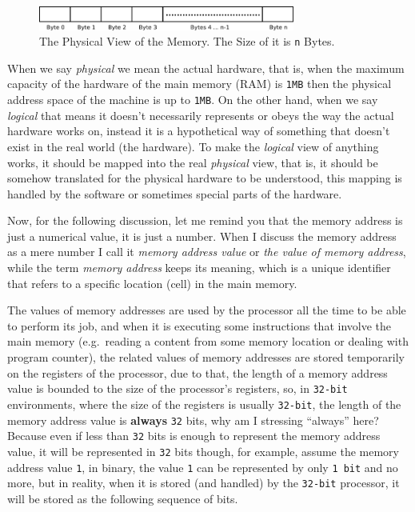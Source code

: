 \begin{figure}
\centering
\includegraphics[width=0.75000\textwidth]{Figures/x86-ch/memory-physical-view.png}
\caption{The Physical View of the Memory. The Size of it is
\lstinline!n! Bytes.}\label{fig:memory_physical_view}
\end{figure}

When we say \emph{physical} we mean the actual hardware, that is, when
the maximum capacity of the hardware of the main memory (RAM) is
\lstinline!1MB! then the physical address space of the machine is up to
\lstinline!1MB!. On the other hand, when we say \emph{logical} that
means it doesn't necessarily represents or obeys the way the actual
hardware works on, instead it is a hypothetical way of something that
doesn't exist in the real world (the hardware). To make the
\emph{logical} view of anything works, it should be mapped into the real
\emph{physical} view, that is, it should be somehow translated for the
physical hardware to be understood, this mapping is handled by the
software or sometimes special parts of the hardware.

Now, for the following discussion, let me remind you that the memory
address is just a numerical value, it is just a number. When I discuss
the memory address as a mere number I call it \emph{memory address
value} or \emph{the value of memory address}, while the term
\emph{memory address} keeps its meaning, which is a unique identifier
that refers to a specific location (cell) in the main memory.

The values of memory addresses are used by the processor all the time to
be able to perform its job, and when it is executing some instructions
that involve the main memory (e.g.~reading a content from some memory
location or dealing with program counter), the related values of memory
addresses are stored temporarily on the registers of the processor, due
to that, the length of a memory address value is bounded to the size of
the processor's registers, so, in \lstinline!32-bit! environments, where
the size of the registers is usually \lstinline!32-bit!, the length of
the memory address value is \textbf{always} \lstinline!32! bits, why am
I stressing ``always'' here? Because even if less than \lstinline!32!
bits is enough to represent the memory address value, it will be
represented in \lstinline!32! bits though, for example, assume the
memory address value \lstinline!1!, in binary, the value \lstinline!1!
can be represented by only \lstinline!1 bit! and no more, but in
reality, when it is stored (and handled) by the \lstinline!32-bit!
processor, it will be stored as the following sequence of bits.

